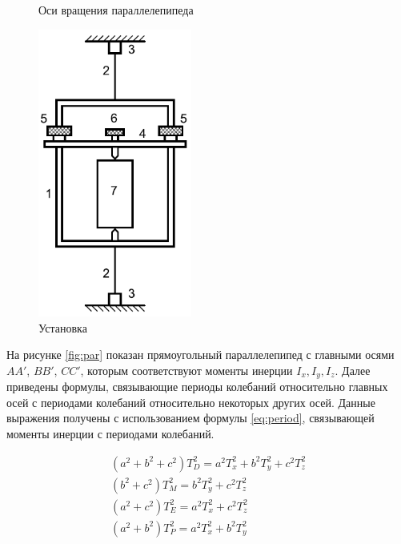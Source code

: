 		\begin{figure}[t]
			\centering
			\begin{minipage}{0.55\textwidth}
				\centering
				
				\caption{Оси вращения параллелепипеда}
				\label{fig:par}
			\end{minipage}\hfill
			\begin{minipage}{0.45\textwidth}
				\centering
				\includegraphics[width=0.45\textwidth]{setup}
				\caption{Установка}
				\label{fig:setup}
			\end{minipage}
		\end{figure}

		На рисунке \ref{fig:par} показан прямоугольный параллелепипед с главными осями $AA'$, $BB'$, $CC'$, которым соответствуют моменты инерции $I_x, I_y, I_z$. Далее приведены формулы, связывающие периоды колебаний относительно главных осей с периодами колебаний относительно некоторых других осей. Данные выражения получены с использованием формулы \ref{eq:period}, связывающей моменты инерции с периодами колебаний.

		\begin{gather}
			\left(a^2+b^2+c^2\right)T_D^2=a^2T_x^2 + b^2T_y^2 + c^2T_z^2 \\
			\left(b^2+c^2\right)T_M^2=b^2 T_y^2+c^2T_z^2 \\
			\left(a^2+c^2\right)T_E^2=a^2 T_x^2+c^2T_z^2 \\
			\left(a^2+b^2\right)T_P^2=a^2 T_x^2+b^2T_y^2
		\end{gather}

